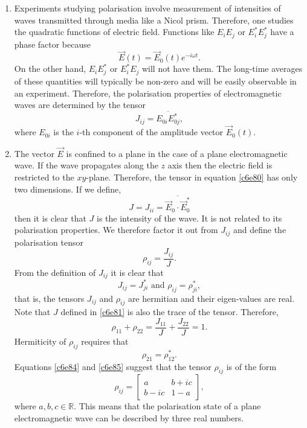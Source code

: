 \begin{enumerate}
\item Experiments studying polarisation involve measurement of intensities of
waves transmitted through media like a Nicol prism. Therefore, one studies the
quadratic functions of electric field. Functions like $E_iE_j$ or $E_i^\ast
E_j^\ast$ have a phase factor because
\begin{equation}\label{c6e79}
\vec{E}(t) = \vec{E}_0(t)e^{-i\omega t}.
\end{equation}
On the other hand, $E_iE_j^\ast$ or $E_i^\ast E_j$ will not have them. The 
long-time averages of these quantities will typically be non-zero and will be
easily observable in an experiment. Therefore, the polarisation properties
of electromagnetic waves are determined by the tensor
\begin{equation}\label{c6e80}
J_{ij} = \overline{E_{0i}{E_{0j}^\ast}},
\end{equation}
where $E_{0i}$ is the $i$-th component of the amplitude vector $\vec{E}_0(t)$.

\item The vector $\vec{E}$ is confined to a plane in the case of a plane 
electromagnetic wave. If the wave propagates along the $z$ axis then the
electric field is restricted to the $xy$-plane. Therefore, the tensor in
equation \eqref{c6e80} has only two dimensions. If we define,
\begin{equation}\label{c6e81}
J = J_{ii} = \overline{\vec{E}_0\cdot\vec{E}_0^\ast}
\end{equation}
then it is clear that $J$ is the intensity of the wave. It is not related
to its polarisation properties. We therefore factor it out from $J_{ij}$ and
define the polarisation tensor
\begin{equation}\label{c6e82}
\rho_{ij} = \frac{J_{ij}}{J}.
\end{equation}
From the definition of $J_{ij}$ it is clear that
\begin{equation}\label{c6e83}
J_{ij} = J_{ji}^\ast \text{ and } \rho_{ij} = \rho_{ji}^\ast,
\end{equation}
that is, the tensors $J_{ij}$ and $\rho_{ij}$ are hermitian and their eigen-values
are real. Note that $J$ defined in \eqref{c6e81} is also the trace of the tensor. 
Therefore,
\begin{equation}\label{c6e84}
\rho_{11} + \rho_{22} = \frac{J_{11}}{J} + \frac{J_{22}}{J} = 1.
\end{equation}
Hermiticity of $\rho_{ij}$ requires that
\begin{equation}\label{c6e85}
\rho_{21} = \rho_{12}^\ast.
\end{equation}
Equations \eqref{c6e84} and \eqref{c6e85} suggest that the tensor $\rho_{ij}$ is
of the form
\begin{equation}\label{c6e86}
\rho_{ij} = \begin{bmatrix}a & b + ic \\ b - ic & 1 - a \end{bmatrix},
\end{equation}
where $a, b, c \in \mathbb{R}$. This means that the polarisation state of a plane
electromagnetic wave can be described by three real numbers.


\end{enumerate}
